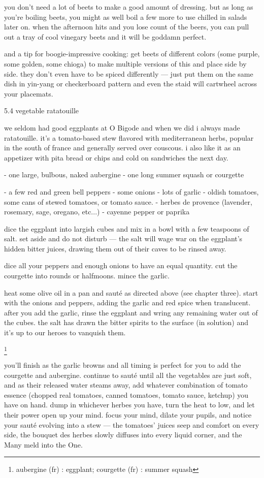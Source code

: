 you don't need a lot of beets to make a good amount of dressing. but as long as you're boiling beets, you might as well boil a few more to use chilled in salads later on. when the afternoon hits and you lose count of the beers, you can pull out a tray of cool vinegary beets and it will be goddamn perfect.

and a tip for boogie-impressive cooking: get beets of different colors (some purple, some golden, some chioga) to make multiple versions of this and place side by side. they don't even have to be spiced differently --- just put them on the same dish in yin-yang or checkerboard pattern and even the staid will cartwheel across your placemats.


5.4  vegetable ratatouille

we seldom had good eggplants at O Bigode and when we did i always made ratatouille. it's a tomato-based stew flavored with mediterranean herbs, popular in the south of france and generally served over couscous. i also like it as an appetizer with pita bread or chips and cold on sandwiches the next day.

-	one large, bulbous, naked aubergine
-	one long summer squash or courgette

-	a few red and green bell peppers
-	some onions
-	lots of garlic
-	oldish tomatoes, some cans of stewed tomatoes, or tomato sauce.
-	herbes de provence (lavender, rosemary, sage, oregano, etc...)
-	cayenne pepper or paprika

dice the eggplant into largish cubes and mix in a bowl with a few teaspoons of salt. set aside and do not disturb --- the salt will wage war on the eggplant's hidden bitter juices, drawing them out of their caves to be rinsed away.

dice all your peppers and enough onions to have an equal quantity. cut the courgette into rounds or halfmoons. mince the garlic.

heat some olive oil in a pan and saut\'{e} as directed above (see chapter three). start with the onions and peppers, adding the garlic and red spice when translucent. after you add the garlic, rinse the eggplant and wring any remaining water out of the cubes. the salt has drawn the bitter spirits to the surface (in solution) and it's up to our heroes to vanquish them.

\footnote{aubergine (fr) : eggplant;   courgette (fr) : summer squash}

you'll finish as the garlic browns and all timing is perfect for you to add the courgette and aubergine. continue to saut\'{e} until all the vegetables are just soft, and as their released water steams away, add whatever combination of tomato essence (chopped real tomatoes, canned tomatoes, tomato sauce, ketchup) you have on hand. dump in whichever herbes you have, turn the heat to low, and let their power open up your mind. focus your mind, dilate your pupils, and notice your saut\'{e} evolving into a stew --- the tomatoes' juices seep and comfort on every side, the bouquet des herbes slowly diffuses into every liquid corner, and the Many meld into the One. 

